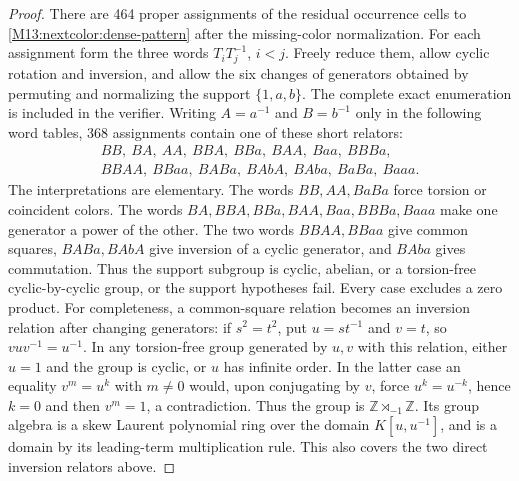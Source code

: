\documentclass[11pt,a4paper,oneside]{report}
\theoremstyle{definition}
\theoremstyle{remark}
\begin{document}
\begin{proof}
There are 464 proper assignments of the residual occurrence cells
to \eqref{M13:nextcolor:dense-pattern} after the missing-color
normalization. For each assignment form the three words
$T_iT_j^{-1}$, $i<j$. Freely reduce them, allow cyclic rotation and
inversion, and allow the six changes of generators obtained by
permuting and normalizing the support $\{1,a,b\}$.
The complete exact enumeration is included in the verifier.
Writing $A=a^{-1}$ and $B=b^{-1}$ only in the following word tables,
368 assignments contain one of these short relators:
\[
 \begin{gathered}
 BB,\ BA,\ AA,\ BBA,\ BBa,\ BAA,\ Baa,\ BBBa,\\
 BBAA,\ BBaa,\ BABa,\ BAbA,\ BAba,\ BaBa,\ Baaa.
 \end{gathered}
\]
The interpretations are elementary. The words $BB,AA,BaBa$ force
torsion or coincident colors. The words $BA,BBA,BBa,BAA,Baa,BBBa,Baaa$
make one generator a power of the other. The two words $BBAA,BBaa$
give common squares, $BABa,BAbA$ give inversion of a cyclic
generator, and $BAba$ gives commutation. Thus the support subgroup
is cyclic, abelian, or a torsion-free cyclic-by-cyclic group, or
the support hypotheses fail. Every case excludes a zero product.
For completeness, a common-square relation becomes an inversion
relation after changing generators: if $s^2=t^2$, put $u=st^{-1}$
and $v=t$, so $vuv^{-1}=u^{-1}$. In any torsion-free group
generated by $u,v$ with this relation, either $u=1$ and the group
is cyclic, or $u$ has infinite order. In the latter case an equality
$v^m=u^k$ with $m\ne0$ would, upon conjugating by $v$, force
$u^k=u^{-k}$, hence $k=0$ and then $v^m=1$, a contradiction.
Thus the group is $\mathbb Z\rtimes_{-1}\mathbb Z$. Its group
algebra is a skew Laurent polynomial ring over the domain
$K[u,u^{-1}]$, and is a domain by its leading-term multiplication
rule. This also covers the two direct inversion relators above.


\end{proof}
\end{document}

